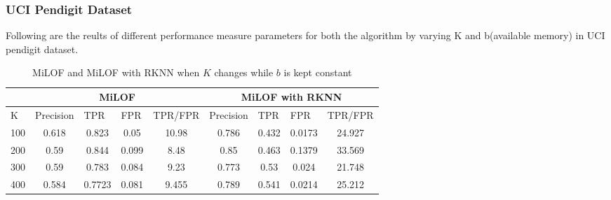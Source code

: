 \subsubsection{UCI Pendigit Dataset}

Following are the reults of different performance measure parameters for both the algorithm by varying K and b(available memory) in UCI pendigit dataset. 

\begin{table}[H]
	\centering
	\caption{MiLOF and MiLOF with RKNN when $K$ changes while $b$ is kept constant}
	\label{my-label}
	\begin{tabular}{|l|c|c|c|c|c|c|c|c|}
		\hline
		& \multicolumn{4}{c|}{MiLOF}                                                                                                    & \multicolumn{4}{c|}{MiLOF with RKNN}                                                                                          \\ \hline
		K                         & \multicolumn{1}{l|}{Precision} & \multicolumn{1}{l|}{TPR} & \multicolumn{1}{l|}{FPR} & \multicolumn{1}{l|}{TPR/FPR} & \multicolumn{1}{l|}{Precision} & \multicolumn{1}{l|}{TPR} & \multicolumn{1}{l|}{FPR} & \multicolumn{1}{l|}{TPR/FPR} \\ \hline
		100                       & 0.618                          & 0.823                              & 0.05                     & 10.98                        & 0.786                          & 0.432                              & 0.0173                   & 24.927                       \\ \hline
		\multicolumn{1}{|c|}{200} & 0.59                           & 0.844                              & 0.099                    & 8.48                         & 0.85                           & 0.463                              & 0.1379                   & 33.569                       \\ \hline
		\multicolumn{1}{|c|}{300} & 0.59                           & 0.783                              & 0.084                    & 9.23                         & 0.773                          & 0.53                               & 0.024                    & 21.748                       \\ \hline
		\multicolumn{1}{|c|}{400} & 0.584                          & 0.7723                             & 0.081                    & 9.455                        & 0.789                          & 0.541                              & 0.0214                   & 25.212                       \\ \hline

\end{tabular}
\end{table}
